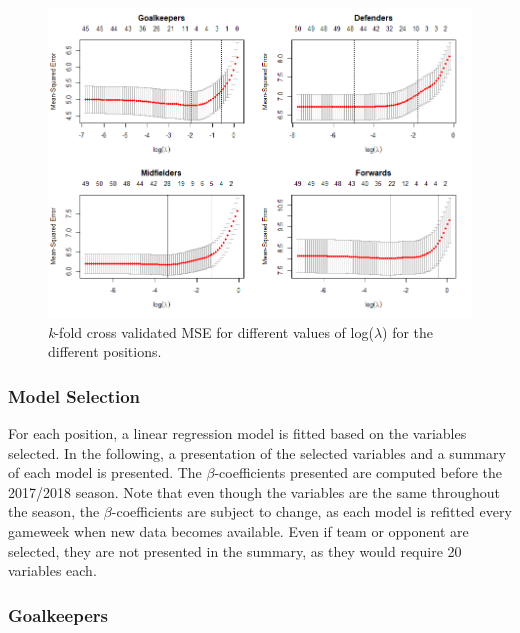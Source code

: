 \newpar

\begin{figure}[htb]
    \centering
    \includegraphics[scale=0.55]{fig/chapter_6/lasso_all.png}
    \caption{\textit{k}-fold cross validated MSE for different values of log($\lambda$) for the different positions.}
\label{fig:lasso_all}    
\end{figure}
 \FloatBarrier

\subsubsection{Model Selection}
For each position, a linear regression model is fitted based on the variables selected. In the following, a presentation of the selected variables and a summary of each model is presented. The $\beta$-coefficients presented are computed before the 2017/2018 season. Note that even though the variables are the same throughout the season, the $\beta$-coefficients are subject to change, as each model is refitted every gameweek when new data becomes available. Even if team or opponent are selected, they are not presented in the summary, as they would require 20 variables each.

\newpar

\subsubsection{Goalkeepers}

